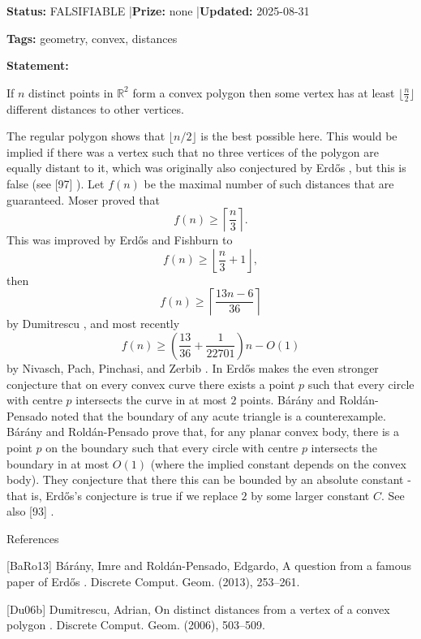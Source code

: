 \documentclass{article}
\begin{document}
\noindent\textbf{Status:} FALSIFIABLE \quad|\quad \textbf{Prize:} none \quad|\quad \textbf{Updated:} 2025-08-31

\noindent\textbf{Tags:} geometry, convex, distances

\medskip

\noindent\textbf{Statement:}

If $n$ distinct points in $\mathbb{R}^2$ form a convex polygon then some vertex has at least $\lfloor \frac{n}{2}\rfloor$ different distances to other vertices.




The regular polygon shows that $\lfloor n/2\rfloor$ is the best possible here. This would be implied if there was a vertex such that no three vertices of the polygon are equally distant to it, which was originally also conjectured by Erd\H{o}s \cite{Er46b}, but this is false (see [97] ). Let $f(n)$ be the maximal number of such distances that are guaranteed. Moser \cite{Mo52} proved that\[f(n) \geq \left\lceil\frac{n}{3}\right\rceil.\]This was improved by Erd\H{o}s and Fishburn \cite{ErFi94} to\[f(n) \geq \left\lfloor \frac{n}{3}+1\right\rfloor,\]then\[f(n) \geq \left\lceil \frac{13n-6}{36}\right\rceil\]by Dumitrescu \cite{Du06b}, and most recently\[f(n) \geq \left(\frac{13}{36}+\frac{1}{22701}\right)n-O(1)\]by Nivasch, Pach, Pinchasi, and Zerbib \cite{NPPZ13}. In \cite{Er46b} Erd\H{o}s makes the even stronger conjecture that on every convex curve there exists a point $p$ such that every circle with centre $p$ intersects the curve in at most $2$ points. B\'{a}r\'{a}ny and Rold\'{a}n-Pensado \cite{BaRo13} noted that the boundary of any acute triangle is a counterexample. B\'{a}r\'{a}ny and Rold\'{a}n-Pensado prove that, for any planar convex body, there is a point $p$ on the boundary such that every circle with centre $p$ intersects the boundary in at most $O(1)$ (where the implied constant depends on the convex body). They conjecture that there this can be bounded by an absolute constant - that is, Erd\H{o}s's conjecture is true if we replace $2$ by some larger constant $C$. See also [93] .




References

[BaRo13] B\'{a}r\'{a}ny, Imre and Rold\'{a}n-Pensado, Edgardo, A question from a famous paper of {E}rd\H{o}s . Discrete Comput. Geom. (2013), 253--261.

[Du06b] Dumitrescu, Adrian, On distinct distances from a vertex of a convex polygon . Discrete Comput. Geom. (2006), 503--509.
\end{document}
